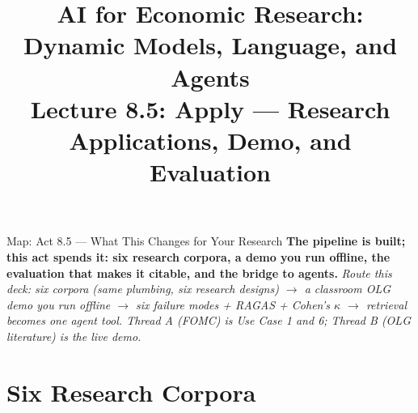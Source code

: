 


\usetikzlibrary{arrows.meta, positioning, shapes, shapes.geometric, fit, calc, backgrounds}

\graphicspath{{./pic/}{./figures/}{../../MiniCourse_8hr/Slides/Module4_Agentic_AI/pic/}{../}}



\title[AI for Econ Research]{AI for Economic Research: Dynamic Models, Language, and Agents\\
Lecture 8.5: Apply --- Research Applications, Demo, and Evaluation}



\makebeamertitle

\begin{frame}{Map: Act 8.5 --- What This Changes for Your Research}
\textbf{The pipeline is built; this act spends it: six research corpora, a demo you run offline, the evaluation that makes it citable, and the bridge to agents.}
\textit{\footnotesize Route this deck: six corpora (same plumbing, six research designs) $\to$ a classroom OLG demo you run offline $\to$ six failure modes + RAGAS + Cohen's $\kappa$ $\to$ retrieval becomes one agent tool.
Thread A (FOMC) is Use Case 1 and 6; Thread B (OLG literature) is the live demo.}
\end{frame}

\section{Six Research Corpora}

